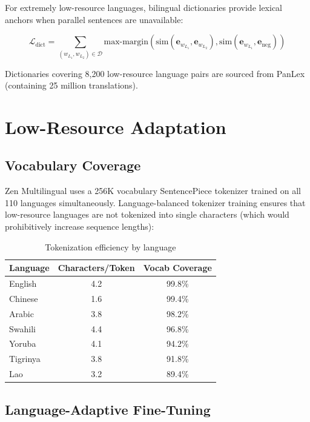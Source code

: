 \documentclass[11pt,a4paper]{article}
\begin{document}
For extremely low-resource languages, bilingual dictionaries provide lexical anchors when parallel sentences are unavailable:

\begin{equation}
\mathcal{L}_{\text{dict}} = \sum_{(w_{L_1}, w_{L_2}) \in \mathcal{D}} \text{max-margin}\!\left(\text{sim}(\mathbf{e}_{w_{L_1}}, \mathbf{e}_{w_{L_2}}), \text{sim}(\mathbf{e}_{w_{L_1}}, \mathbf{e}_{\text{neg}})\right)
\end{equation}

Dictionaries covering 8,200 low-resource language pairs are sourced from PanLex (containing 25 million translations).

\section{Low-Resource Adaptation}

\subsection{Vocabulary Coverage}

Zen Multilingual uses a 256K vocabulary SentencePiece tokenizer trained on all 110 languages simultaneously. Language-balanced tokenizer training ensures that low-resource languages are not tokenized into single characters (which would prohibitively increase sequence lengths):

\begin{table}[H]
\centering
\caption{Tokenization efficiency by language}
\label{tab:tokenization}
\begin{tabular}{lcc}
\toprule
Language & Characters/Token & Vocab Coverage \\
\midrule
English & 4.2 & 99.8\% \\
Chinese & 1.6 & 99.4\% \\
Arabic & 3.8 & 98.2\% \\
Swahili & 4.4 & 96.8\% \\
Yoruba & 4.1 & 94.2\% \\
Tigrinya & 3.8 & 91.8\% \\
Lao & 3.2 & 89.4\% \\
\bottomrule
\end{tabular}
\end{table}

\subsection{Language-Adaptive Fine-Tuning}
\end{document}
